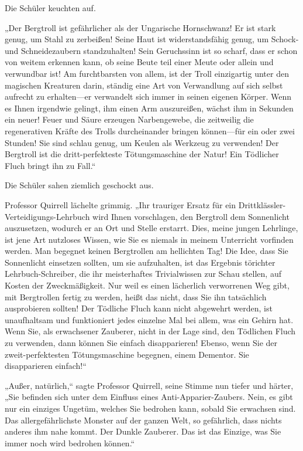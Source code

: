 {Die Schüler keuchten auf.

„Der Bergtroll ist gefährlicher als der Ungarische Hornschwanz! Er ist stark genug, um Stahl zu zerbeißen! Seine Haut ist widerstandsfähig genug, um Schock- und Schneidezaubern standzuhalten! Sein Geruchssinn ist so scharf, dass er schon von weitem erkennen kann, ob seine Beute teil einer Meute oder allein und verwundbar ist! Am furchtbarsten von allem, ist der Troll einzigartig unter den magischen Kreaturen darin, ständig eine Art von Verwandlung auf sich selbst aufrecht zu erhalten—er verwandelt sich immer in seinen eigenen Körper. Wenn es Ihnen irgendwie gelingt, ihm einen Arm auszureißen, wächst ihm in Sekunden ein neuer! Feuer und Säure erzeugen Narbengewebe, die zeitweilig die regenerativen Kräfte des Trolls durcheinander bringen können—für ein oder zwei Stunden! Sie sind schlau genug, um Keulen als Werkzeug zu verwenden! Der Bergtroll ist die dritt-perfekteste Tötungsmaschine der Natur! Ein Tödlicher Fluch bringt ihn zu Fall.“

Die Schüler sahen ziemlich geschockt aus.

Professor Quirrell lächelte grimmig. „Ihr trauriger Ersatz für ein Drittklässler-Verteidigungs-Lehrbuch wird Ihnen vorschlagen, den Bergtroll dem Sonnenlicht auszusetzen, wodurch er an Ort und Stelle erstarrt. Dies, meine jungen Lehrlinge, ist jene Art nutzloses Wissen, wie Sie es niemals in meinem Unterricht vorfinden werden. Man begegnet keinen Bergtrollen am hellichten Tag! Die Idee, dass Sie Sonnenlicht einsetzen sollten, um sie aufzuhalten, ist das Ergebnis törichter Lehrbuch-Schreiber, die ihr meisterhaftes Trivialwissen zur Schau stellen, auf Kosten der Zweckmäßigkeit. Nur weil es einen lächerlich verworrenen Weg gibt, mit Bergtrollen fertig zu werden, heißt das nicht, dass Sie ihn tatsächlich ausprobieren sollten! Der Tödliche Fluch kann nicht abgewehrt werden, ist unaufhaltsam und funktioniert jedes einzelne Mal bei allem, was ein Gehirn hat. Wenn Sie, als erwachsener Zauberer, nicht in der Lage sind, den Tödlichen Fluch zu verwenden, dann können Sie einfach disapparieren! Ebenso, wenn Sie der zweit-perfektesten Tötungsmaschine begegnen, einem Dementor. Sie disapparieren einfach!“

„Außer, natürlich,“ sagte Professor Quirrell, seine Stimme nun tiefer und härter, „Sie befinden sich unter dem Einfluss eines Anti-Apparier-Zaubers. Nein, es gibt nur ein einziges Ungetüm, welches Sie bedrohen kann, sobald Sie erwachsen sind. Das allergefährlichste Monster auf der ganzen Welt, so gefährlich, dass nichts anderes ihm nahe kommt. Der Dunkle Zauberer. Das ist das Einzige, was Sie immer noch wird bedrohen können.“

}
